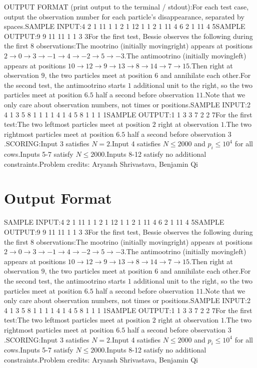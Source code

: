 \documentclass[12pt]{article}
\begin{document}
OUTPUT FORMAT (print output to the terminal / stdout):For each test case, output the observation number for each particle's
disappearance, separated by spaces.SAMPLE INPUT:4
2
1 11
1 1
2
1 12
1 1
2
1 11
4 6
2
1 11
4 5SAMPLE OUTPUT:9 9
11 11
1 1
3 3For the first test, Bessie observes the following during the first $8$
observations:The mootrino (initially movingright) appears at positions
$2 \rightarrow 0 \rightarrow 3 \rightarrow -1 \rightarrow 4 \rightarrow -2 \rightarrow 5 \rightarrow -3$.The antimootrino (initially movingleft) appears at positions
$10 \rightarrow 12 \rightarrow 9 \rightarrow 13 \rightarrow 8 \rightarrow 14 \rightarrow 7 \rightarrow 15$.Then right at observation $9$, the two particles meet at position $6$ and
annihilate each other.For the second test, the antimootrino starts $1$ additional unit to the right,
so the two particles meet at position $6.5$ half a second before observation
$11$.Note that we only care about observation numbers, not times or positions.SAMPLE INPUT:2
4
1 3 5 8
1 1 1 1
4
1 4 5 8
1 1 1 1SAMPLE OUTPUT:1 1 3 3
7 2 2 7For the first test:The two leftmost particles meet at position $2$ right at observation
$1$.The two rightmost particles meet at position $6.5$ half a second
before observation $3$.SCORING:Input 3 satisfies $N = 2$.Input 4 satisfies $N \leq 2000$ and $p_i \leq 10^4$ for all cows.Inputs 5-7 satisfy $N \leq 2000$.Inputs 8-12 satisfy no additional constraints.Problem credits: Aryansh Shrivastava, Benjamin Qi

\section*{Output Format}
SAMPLE INPUT:4
2
1 11
1 1
2
1 12
1 1
2
1 11
4 6
2
1 11
4 5SAMPLE OUTPUT:9 9
11 11
1 1
3 3For the first test, Bessie observes the following during the first $8$
observations:The mootrino (initially movingright) appears at positions
$2 \rightarrow 0 \rightarrow 3 \rightarrow -1 \rightarrow 4 \rightarrow -2 \rightarrow 5 \rightarrow -3$.The antimootrino (initially movingleft) appears at positions
$10 \rightarrow 12 \rightarrow 9 \rightarrow 13 \rightarrow 8 \rightarrow 14 \rightarrow 7 \rightarrow 15$.Then right at observation $9$, the two particles meet at position $6$ and
annihilate each other.For the second test, the antimootrino starts $1$ additional unit to the right,
so the two particles meet at position $6.5$ half a second before observation
$11$.Note that we only care about observation numbers, not times or positions.SAMPLE INPUT:2
4
1 3 5 8
1 1 1 1
4
1 4 5 8
1 1 1 1SAMPLE OUTPUT:1 1 3 3
7 2 2 7For the first test:The two leftmost particles meet at position $2$ right at observation
$1$.The two rightmost particles meet at position $6.5$ half a second
before observation $3$.SCORING:Input 3 satisfies $N = 2$.Input 4 satisfies $N \leq 2000$ and $p_i \leq 10^4$ for all cows.Inputs 5-7 satisfy $N \leq 2000$.Inputs 8-12 satisfy no additional constraints.Problem credits: Aryansh Shrivastava, Benjamin Qi
\end{document}
